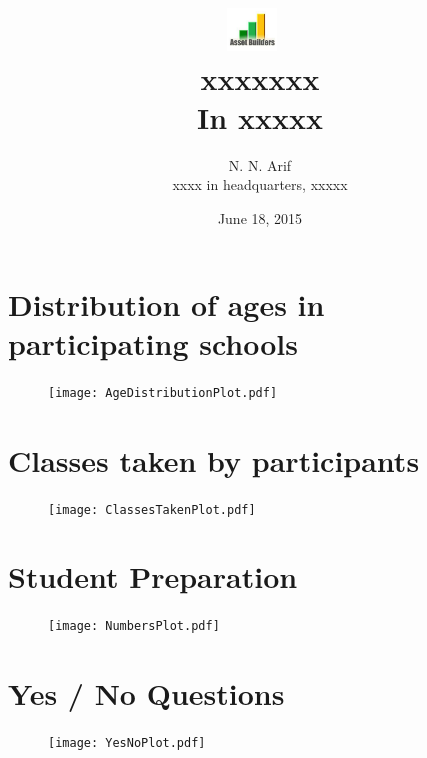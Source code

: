 \documentclass{article}%
\title{%
\includegraphics[width=0.1\textwidth]{ABLogo.pdf}~ 
\\[1cm]
xxxxxxx
\\In xxxxx 
}
\author{N. N. Arif
\\ xxxx in headquarters, xxxxx}
\date{June 18, 2015}%
\begin{document}
%
\normalsize%
\maketitle%
\section{Distribution of ages in participating schools}%
\label{sec:Distributionofagesinparticipatingschools}%


\begin{figure}[H]%
\centering%
\texttt{[image: AgeDistributionPlot.pdf]}%
\end{figure}

%
\section{Classes taken by participants}%
\label{sec:Classestakenbyparticipants}%


\begin{figure}[H]%
\centering%
\texttt{[image: ClassesTakenPlot.pdf]}%
\end{figure}

%
\section{Student Preparation}%
\label{sec:StudentPreparation}%


\begin{figure}[H]%
\centering%
\texttt{[image: NumbersPlot.pdf]}%
\end{figure}

%
\section{Yes / No Questions}%
\label{sec:Yes/NoQuestions}%


\begin{figure}[H]%
\centering%
\texttt{[image: YesNoPlot.pdf]}%
\end{figure}
\end{document}

